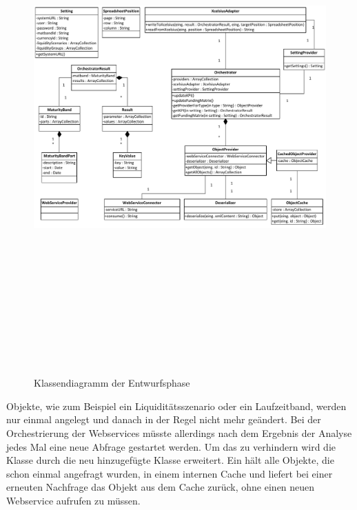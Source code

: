 \begin{onehalfspacing}
\begin{figure}[!ht]
\centering
\setlength{\unitlength}{1mm}
\includegraphics[angle=90,height=197mm]{Visio/Entwurf.pdf}
\caption{Klassendiagramm der Entwurfsphase\label{fig:klassendiagramm_entwurf}}
\end{figure}

Objekte, wie zum Beispiel ein Liquiditätsszenario oder ein Laufzeitband, werden nur einmal angelegt und danach in der Regel nicht mehr geändert. Bei der Orchestrierung der Webservices müsste allerdings nach dem Ergebnis der Analyse jedes Mal eine neue Abfrage gestartet werden. Um das zu verhindern wird die Klasse  durch die neu hinzugefügte Klasse  erweitert. Ein  hält alle Objekte, die schon einmal angefragt wurden, in einem internen Cache und liefert bei einer erneuten Nachfrage das Objekt aus dem Cache zurück, ohne einen neuen Webservice aufrufen zu müssen.


\end{onehalfspacing}
